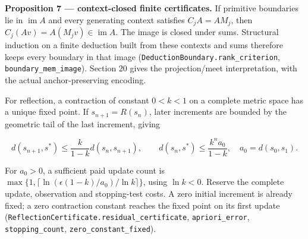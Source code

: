 \documentclass[
]{article}
\begin{document}
\textbf{Proposition 7 --- context-closed finite certificates.} If
primitive boundaries lie in \(\operatorname{im}A\) and every generating
context satisfies \(C_jA=AM_j\), then
\(C_j(Av)=A(M_jv)\in\operatorname{im}A\). The image is closed under
sums. Structural induction on a finite deduction built from these
contexts and sums therefore keeps every boundary in that image
(\texttt{D\allowbreak{}e\allowbreak{}d\allowbreak{}u\allowbreak{}c\allowbreak{}t\allowbreak{}i\allowbreak{}o\allowbreak{}n\allowbreak{}B\allowbreak{}o\allowbreak{}u\allowbreak{}n\allowbreak{}d\allowbreak{}a\allowbreak{}r\allowbreak{}y\allowbreak{}.\allowbreak{}r\allowbreak{}a\allowbreak{}n\allowbreak{}k\allowbreak{}\_\allowbreak{}c\allowbreak{}r\allowbreak{}i\allowbreak{}t\allowbreak{}e\allowbreak{}r\allowbreak{}i\allowbreak{}o\allowbreak{}n},
\texttt{b\allowbreak{}o\allowbreak{}u\allowbreak{}n\allowbreak{}d\allowbreak{}a\allowbreak{}r\allowbreak{}y\allowbreak{}\_\allowbreak{}m\allowbreak{}e\allowbreak{}m\allowbreak{}\_\allowbreak{}i\allowbreak{}m\allowbreak{}a\allowbreak{}g\allowbreak{}e}).
Section 20 gives the
p\allowbreak{}r\allowbreak{}o\allowbreak{}j\allowbreak{}e\allowbreak{}c\allowbreak{}t\allowbreak{}i\allowbreak{}o\allowbreak{}n\allowbreak{}/\allowbreak{}m\allowbreak{}e\allowbreak{}e\allowbreak{}t
interpretation, with the actual anchor-preserving encoding.

For reflection, a contraction of constant \(0<k<1\) on a complete metric
space has a unique fixed point. If \(s_{n+1}=R(s_n)\), later increments
are bounded by the geometric tail of the last increment, giving

\[
d(s_{n+1},s^*)\le\frac{k}{1-k}d(s_n,s_{n+1}),
\qquad d(s_n,s^*)\le\frac{k^n a_0}{1-k},\quad a_0=d(s_0,s_1).
\]

For \(a_0>0\), a sufficient paid update count is
\(\max\{1,\lceil\ln(\epsilon(1-k)/a_0)/\ln k\rceil\}\), using
\(\ln k<0\). Reserve the complete update, observation and stopping-test
costs. A zero initial increment is already fixed; a zero contraction
constant reaches the fixed point on its first update
(\texttt{R\allowbreak{}e\allowbreak{}f\allowbreak{}l\allowbreak{}e\allowbreak{}c\allowbreak{}t\allowbreak{}i\allowbreak{}o\allowbreak{}n\allowbreak{}C\allowbreak{}e\allowbreak{}r\allowbreak{}t\allowbreak{}i\allowbreak{}f\allowbreak{}i\allowbreak{}c\allowbreak{}a\allowbreak{}t\allowbreak{}e\allowbreak{}.\allowbreak{}r\allowbreak{}e\allowbreak{}s\allowbreak{}i\allowbreak{}d\allowbreak{}u\allowbreak{}a\allowbreak{}l\allowbreak{}\_\allowbreak{}c\allowbreak{}e\allowbreak{}r\allowbreak{}t\allowbreak{}i\allowbreak{}f\allowbreak{}i\allowbreak{}c\allowbreak{}a\allowbreak{}t\allowbreak{}e},
\texttt{apriori\_error}, \texttt{stopping\_count},
\texttt{z\allowbreak{}e\allowbreak{}r\allowbreak{}o\allowbreak{}\_\allowbreak{}c\allowbreak{}o\allowbreak{}n\allowbreak{}s\allowbreak{}t\allowbreak{}a\allowbreak{}n\allowbreak{}t\allowbreak{}\_\allowbreak{}f\allowbreak{}i\allowbreak{}x\allowbreak{}e\allowbreak{}d}).
\end{document}
